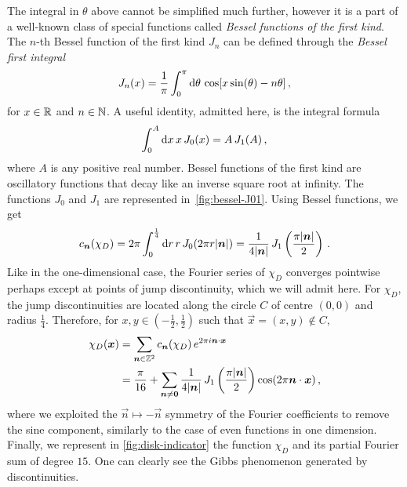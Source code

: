 \begin{example}
	The integral in $\theta$ above cannot be simplified much further, however it is a part
	of a well-known class of special functions called \emph{Bessel functions of the first
		kind}. The $n$-th Bessel function of the first kind $J_n$ can be defined through the
	\emph{Bessel first integral}
	\begin{equation}
		J_n(x)=\frac{1}{\pi}\int_0^\pi\mathrm{d}\theta\,\cos[x\sin(\theta)-n\theta]\,,
	\end{equation}
	for $x\in\mathbb{R}$ and $n\in\mathbb{N}$. A useful identity, admitted here, is the integral formula
	\begin{equation}
		\int_0^A\mathrm{d} x\,x\,J_0(x)=A\,J_1(A)\,,
	\end{equation}
	where $A$ is any positive real number. Bessel functions of the first kind are
	oscillatory functions that decay like an inverse square root at infinity. The functions
	$J_0$ and $J_1$ are represented in~\cref{fig:bessel-J01}. Using Bessel functions, we get
	\begin{equation}
		c_{\bm{n}}(\chi_D)=2\pi\int_0^{\frac{1}{4}}\mathrm{d} r\,r\,J_0(2\pi r|\bm{n}|)
		=\frac{1}{4|\bm{n}|}\,J_1\left(\frac{\pi|\bm{n}|}{2}\right)\,.
	\end{equation}
	Like in the one-dimensional case, the Fourier series of $\chi_D$ converges pointwise
	perhaps except at points of jump discontinuity, which we will admit here. For $\chi_D$,
	the jump discontinuities are located along the circle $C$ of centre $(0,0)$ and radius
	$\frac14$. Therefore, for $x,y\in(-\frac12,\frac12)$ such that $\vec{x}=(x,y)\notin C$,
	\begin{align}
		\chi_D(\bm{x}) & =\sum_{\bm{n}\in\mathbb{Z}^2}c_{\bm{n}}(\chi_D)\,
		e^{2\pi i\bm{n}\cdotp\bm{x}}                                \\
		                & =\frac{\pi}{16}+\sum_{\bm{n}\neq\bm{0}}
		\frac{1}{4|\bm{n}|}\,J_1\left(\frac{\pi|\bm{n}|}{2}\right)
		\cos(2\pi\bm{n}\cdot\bm{x})\,,
	\end{align}
	where we exploited the $\vec{n}\mapsto-\vec{n}$ symmetry of the Fourier coefficients to
	remove the sine component, similarly to the case of even functions in one dimension.
	Finally, we represent in \cref{fig:disk-indicator} the function $\chi_D$ and its partial
	Fourier sum of degree $15$. One can clearly see the Gibbs phenomenon generated by
	discontinuities.
\end{example}
